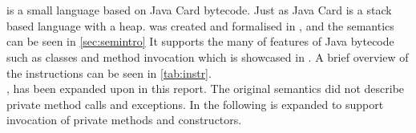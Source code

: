 \section{\jcl}
\jcl is a small language based on Java Card bytecode. Just as Java Card \jcl is a stack based language with a heap. \jcl was created and formalised in \cite{javasec}, and the semantics can be seen in \cref{sec:semintro}
It supports the many of features of Java bytecode such as classes and method invocation which is showcased in . 
A brief overview of the instructions can be seen in \cref{tab:instr}.\\

\noindent , has been expanded upon in this report. 
The original semantics did not describe private method calls and exceptions. 
In the following \jcl is expanded to support invocation of private methods and constructors.

